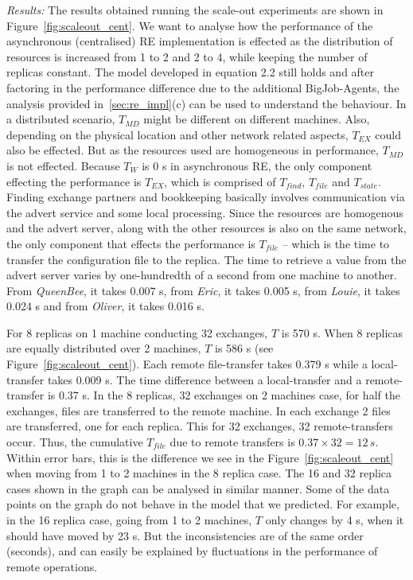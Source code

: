 \documentclass{rspublic}
\newcommand{\jhanote}[1]{ {\textcolor{red} { ***shantenu: #1 }}}
\newcommand{\alnote}[1]{ {\textcolor{blue} { ***andre: #1 }}}
\newcommand{\alnote}[1]{}
\newcommand{\jhanote}[1]{}
\begin{document}
{\it Results:} The results obtained running the scale-out experiments
are shown in Figure~\ref{fig:scaleout_cent}. We want to analyse how
the performance of the asynchronous (centralised) RE implementation is
effected as the distribution of resources is increased from 1 to 2 and
2 to 4, while keeping the number of replicas constant. The model
developed in equation 2.2 still holds and after factoring in the
performance difference due to the additional BigJob-Agents, the
analysis provided
in~\ref{sec:re_impl}(c) %
can be used to understand the behaviour. In a distributed scenario,
$T_{MD}$ might be different on different machines. Also, depending on
the physical location and other network related aspects, $T_{EX}$
could also be effected.  But as the resources used are homogeneous in
performance, $T_{MD}$ is not effected. Because $T_W$ is 0 s in
asynchronous RE, the only component effecting the performance is
$T_{EX}$, which is comprised of $T_{find}$, $T_{file}$ and
$T_{state}$. Finding exchange partners and bookkeeping basically
involves communication via the advert service and some local
processing.  Since the resources are homogenous and the advert server,
along with the other resources is also on the same network, the only
component that effects the performance is $T_{file}$ -- which is
the time to transfer the configuration file to the replica. The time
to retrieve a value from the advert server varies by one-hundredth of
a second from one machine to another. From {\it QueenBee}, it takes
0.007 s, from {\it Eric}, it takes 0.005 s, from {\it Louie}, it takes
0.024 s and from {\it Oliver}, it takes 0.016 s.

For 8 replicas on 1 machine conducting 32 exchanges, $T$ is 570
s. When 8 replicas are equally distributed over 2 machines, $T$ is 586
s (see Figure~\ref{fig:scaleout_cent}). Each remote file-transfer
takes 0.379 s while a local-transfer takes 0.009 s. The time
difference between a local-transfer and a remote-transfer is 0.37
s. In the 8 replicas, 32 exchanges on 2 machines case, for half the
exchanges, files are transferred to the remote machine. In each
exchange 2 files are transferred, one for each replica. This for 32
exchanges, 32 remote-transfers occur. Thus, the cumulative $T_{file}$
due to remote transfers is $0.37 \times 32=12\,s$. Within error bars,
this is the difference we see in the Figure~\ref{fig:scaleout_cent}
when moving from 1 to 2 machines in the 8 replica case. The 16 and 32
replica cases shown in the graph can be analysed in similar manner.
Some of the data points on the graph do not behave in the model that
we predicted. %
For example, in the 16 replica case, going from 1 to 2 machines, $T$
only changes by 4 s, when it should have moved by 23 s. But the
inconsistencies are of the same order (seconds), and can easily be
explained by fluctuations in the performance of remote operations.
\end{document}
